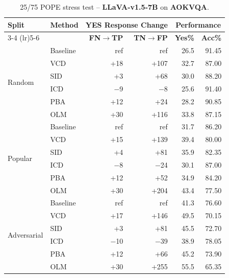 \documentclass[11pt]{article}
\begin{document}
\begin{table}[ht]
\centering
\caption{25/75 POPE stress test -- \textbf{LLaVA-v1.5-7B} on \textbf{AOKVQA}.}
\label{tab:25_75_llava_aokvqa}
\setlength{\tabcolsep}{6pt}
\renewcommand{\arraystretch}{1.1}
\begin{tabular}{l|l|rr|rr}
\toprule
\multirow{2}{*}{\textbf{Split}} &
\multirow{2}{*}{\textbf{Method}} &
\multicolumn{2}{c|}{\textbf{YES Response Change}} &
\multicolumn{2}{c}{\textbf{Performance}} \\
\cmidrule(lr){3-4} \cmidrule(lr){5-6}
& & \textbf{FN$\to$TP} & \textbf{TN$\to$FP} & \textbf{Yes\%} & \textbf{Acc\%} \\
\midrule

\multirow{6}{*}{Random}
& Baseline & ref   & ref  & 26.5 & 91.45 \\
& VCD      & +18   & +107 & 32.7 & 87.00 \\
& SID      & +3    & +68  & 30.0 & 88.20 \\
& ICD      & $-$9  & $-$8 & 25.6 & 91.40 \\
& PBA      & +12   & +24  & 28.2 & 90.85 \\
& OLM      & +30   & +116 & 33.8 & 87.15 \\
\midrule

\multirow{6}{*}{Popular}
& Baseline & ref   & ref   & 31.7 & 86.20 \\
& VCD      & +15   & +139  & 39.4 & 80.00 \\
& SID      & +4    & +81   & 35.9 & 82.35 \\
& ICD      & $-$8  & $-$24 & 30.1 & 87.00 \\
& PBA      & +12   & +52   & 34.9 & 84.20 \\
& OLM      & +30   & +204  & 43.4 & 77.50 \\
\midrule

\multirow{6}{*}{Adversarial}
& Baseline & ref   & ref   & 41.3 & 76.60 \\
& VCD      & +17   & +146  & 49.5 & 70.15 \\
& SID      & +3    & +81   & 45.5 & 72.70 \\
& ICD      & $-$10 & $-$39 & 38.9 & 78.05 \\
& PBA      & +12   & +66   & 45.2 & 73.90 \\
& OLM      & +30   & +255  & 55.5 & 65.35 \\
\bottomrule
\end{tabular}
\end{table}

\end{document}
